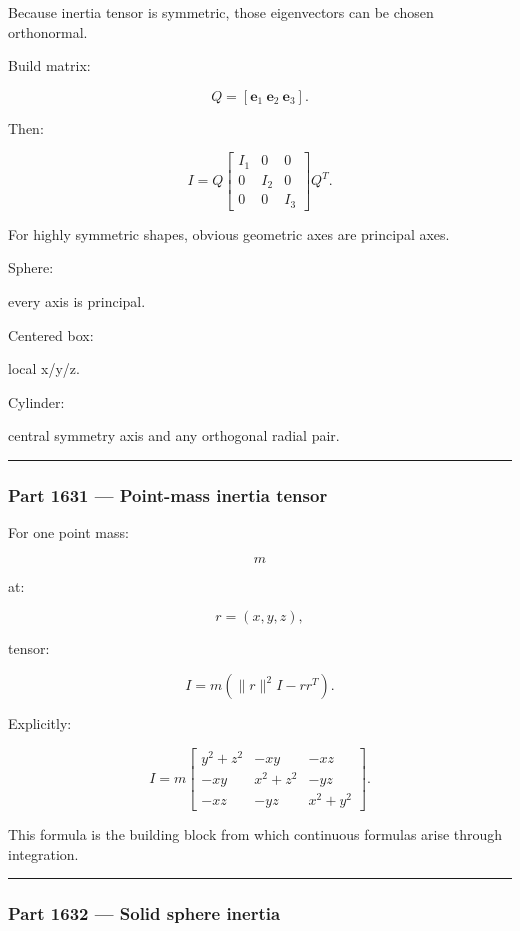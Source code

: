 Because inertia tensor is symmetric, those eigenvectors can be chosen orthonormal.

Build matrix:

\[
Q=
[
\mathbf{e}_1\
\mathbf{e}_2\
\mathbf{e}_3
].
\]

Then:

\[
\boxed{
I
=
Q
\begin{bmatrix}
I_1&0&0\\
0&I_2&0\\
0&0&I_3
\end{bmatrix}
Q^T.
}
\]

For highly symmetric shapes, obvious geometric axes are principal axes.

Sphere:

every axis is principal.

Centered box:

local x/y/z.

Cylinder:

central symmetry axis and any orthogonal radial pair.

\begin{center}\rule{0.5\linewidth}{0.5pt}\end{center}

\subsubsection{Part 1631 --- Point-mass inertia tensor}\label{part-1631-point-mass-inertia-tensor}

For one point mass:

\[
m
\]

at:

\[
r=(x,y,z),
\]

tensor:

\[
\boxed{
I
=
m
(
\|r\|^2I-r r^T
).
}
\]

Explicitly:

\[
I
=
m
\begin{bmatrix}
y^2+z^2&-xy&-xz\\
-xy&x^2+z^2&-yz\\
-xz&-yz&x^2+y^2
\end{bmatrix}.
\]

This formula is the building block from which continuous formulas arise through integration.

\begin{center}\rule{0.5\linewidth}{0.5pt}\end{center}

\subsubsection{Part 1632 --- Solid sphere inertia}\label{part-1632-solid-sphere-inertia}

